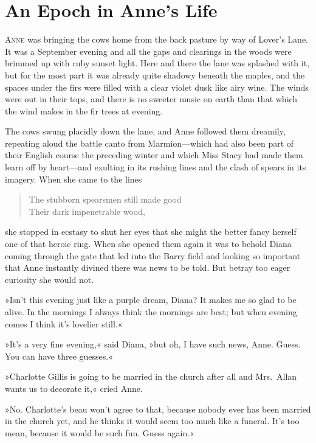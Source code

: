 \chapter{An Epoch in Anne's Life}

\lettrine[lines=4]{A}{nne} was bringing the cows home from the back pasture by way of Lover's Lane. It was a September evening and all the gaps and clearings in the woods were brimmed up with ruby sunset light. Here and there the lane was splashed with it, but for the most part it was already quite shadowy beneath the maples, and the spaces under the firs were filled with a clear violet dusk like airy wine. The winds were out in their tops, and there is no sweeter music on earth than that which the wind makes in the fir trees at evening.

The cows swung placidly down the lane, and Anne followed them dreamily, repeating aloud the battle canto from Marmion—which had also been part of their English course the preceding winter and which Miss Stacy had made them learn off by heart—and exulting in its rushing lines and the clash of spears in its imagery. When she came to the lines

\begin{verse}
The stubborn spearsmen still made good\\
Their dark impenetrable wood,\\
\end{verse}

she stopped in ecstasy to shut her eyes that she might the better fancy herself one of that heroic ring. When she opened them again it was to behold Diana coming through the gate that led into the Barry field and looking so important that Anne instantly divined there was news to be told. But betray too eager curiosity she would not.

»Isn't this evening just like a purple dream, Diana? It makes me so glad to be alive. In the mornings I always think the mornings are best; but when evening comes I think it's lovelier still.«

»It's a very fine evening,« said Diana, »but oh, I have such news, Anne. Guess. You can have three guesses.«

»Charlotte Gillis is going to be married in the church after all and Mrs.~Allan wants us to decorate it,« cried Anne.

»No. Charlotte's beau won't agree to that, because nobody ever has been married in the church yet, and he thinks it would seem too much like a funeral. It's too mean, because it would be such fun. Guess again.«

